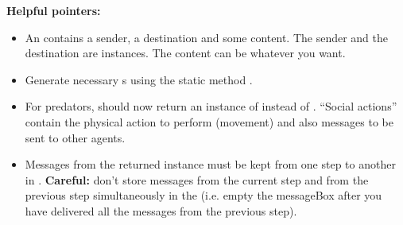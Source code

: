 \documentclass[a4paper, 12pt, twoside]{article}
\begin{document}
\textbf{Helpful pointers:} \begin{itemize}\itemsep1.5ex
	\item An  contains a sender, a destination and some content. The sender and the destination are  instances. The content can be whatever you want.
	\item Generate necessary s using the static method .
	\item For predators,  should now return an instance of  instead of . ``Social actions'' contain the physical action to perform (movement) and also messages to be sent to other agents.
	\item Messages from the returned  instance must be kept from one step to another in . \textbf{Careful:} don't store messages from the current step and from the previous step simultaneously in the  (i.e. empty the messageBox after you have delivered all the messages from the previous step). 
\end{itemize}


\end{document}
